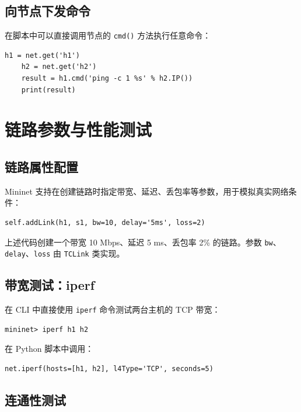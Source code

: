 \documentclass[12pt,a4paper,openany]{ctexbook}
\begin{document}
\section{向节点下发命令}

在脚本中可以直接调用节点的 \texttt{cmd()} 方法执行任意命令：

\begin{lstlisting}[style=mininetstyle]
	h1 = net.get('h1')
	h2 = net.get('h2')
	result = h1.cmd('ping -c 1 %s' % h2.IP())
	print(result)
\end{lstlisting}


\chapter{链路参数与性能测试}

\section{链路属性配置}

Mininet 支持在创建链路时指定带宽、延迟、丢包率等参数，用于模拟真实网络条件：

\begin{lstlisting}[style=mininetstyle]
	self.addLink(h1, s1, bw=10, delay='5ms', loss=2)
\end{lstlisting}

上述代码创建一个带宽 10 Mbps、延迟 5 ms、丢包率 2\% 的链路。参数 \texttt{bw}、\texttt{delay}、\texttt{loss} 由 \texttt{TCLink} 类实现。

\section{带宽测试：iperf}

在 CLI 中直接使用 \texttt{iperf} 命令测试两台主机的 TCP 带宽：

\begin{lstlisting}[style=bashstyle]
	mininet> iperf h1 h2
\end{lstlisting}

在 Python 脚本中调用：

\begin{lstlisting}[style=mininetstyle]
	net.iperf(hosts=[h1, h2], l4Type='TCP', seconds=5)
\end{lstlisting}

\section{连通性测试}
\end{document}
